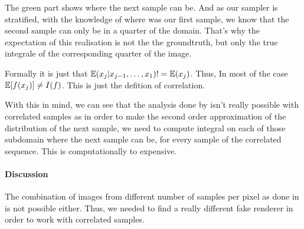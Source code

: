 \documentclass{classeENS}
\begin{document}
\begin{center}
\end{center}
The green part shows where the next sample can be. And as our sampler is stratified,
with the knowledge of where was our first sample, we know that the second sample can only
be in a quarter of the domain. That's why the expectation of this realisation is not the
the groundtruth, but only the true integrale of the corresponding quarter of the image.
\par Formally it is just that $\mathbb E(x_j | x_{j-1},\dots,x_1) != \mathbb E(x_j)$. Thus, In
most of the case $\mathbb E[f(x_j)] \neq I(f)$. This is just the defition of correlation.

\par With this in mind, we can see that the analysis done by \cite{10.1145/3550454.3555515}
isn't really possible with correlated samples as in order to make the second order approximation
of the distribution of the next sample, we need to compute integral on each of 
those subdomain where the next sample can be, for every sample of the correlated sequence. This
is computationally to expensive.

\paragraph*{Discussion} The combination of images from different number of samples per pixel 
as done in \cite{kuznetsov2018deep} is not possible either. Thus, we needed to find a really 
different fake renderer in order to work with correlated samples.
\end{document}

